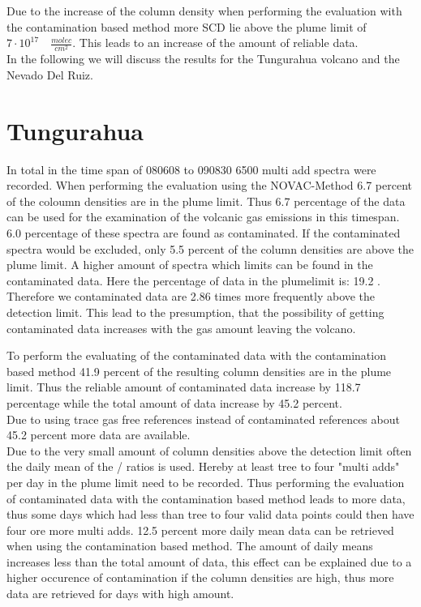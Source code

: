 \documentclass  [
  paper    = a4,
  BCOR     = 10mm,
  twoside,
  fontsize = 12pt,
  fleqn,
  toc      = bibnumbered,
  toc      = listofnumbered,
  numbers  = noendperiod,
  headings = normal,
  listof   = leveldown,
  version  = 3.03
]                                       {scrreprt}
\begin{document}
Due to the increase of the   column density when performing the evaluation with the contamination based method more   SCD lie above the plume limit of $7\cdot10^{17}\quad \frac{molec}{cm^2}$. This leads to an increase of the amount of reliable data.\\ 
In the following we will discuss the results for the Tungurahua volcano and the Nevado Del Ruiz. 



\section*{Tungurahua}
 	In total in the time span of 080608 to 090830 6500 multi add spectra were recorded. 
 	When performing the evaluation using the NOVAC-Method 6.7 percent of the   coloumn densities are in the plume limit. Thus 6.7 percentage of the data can be used for the examination of the volcanic gas emissions in this timespan.
 	6.0 percentage of these spectra are found as contaminated. If the contaminated spectra would be excluded, only 5.5 percent of the   column densities are above the plume limit. A higher amount of spectra which   limits can be found in the contaminated data. Here the percentage of data in the plumelimit is: 19.2 .
 	Therefore we contaminated data are 2.86 times more frequently above the detection limit. This lead to the presumption, that the possibility of getting contaminated data increases with the gas amount leaving the volcano.
 	
 	To perform the evaluating of the contaminated data with the contamination based method 41.9 percent of the resulting   column densities are in the plume limit. Thus the reliable amount of contaminated data increase by 118.7 percentage while the total amount of data increase by 45.2 percent.\\
 	Due to using trace gas free references instead of contaminated references about 45.2 percent more data are available. \\
 	Due to the very small amount of   column densities above the detection limit often the daily mean of the /  ratios is used. Hereby at least tree to four "multi adds" per day in the plume limit need to be recorded. Thus performing the evaluation of contaminated data with the contamination based method leads to more data, thus some days which had less than  tree to four valid data points could then have four ore more multi adds. 12.5 percent more daily mean data can be retrieved when using the contamination based method. The amount of daily means increases less than the total amount of data, this effect can be explained due to a higher occurence of contamination if the   column densities are high, thus more data are retrieved for days with high   amount.
\end{document}
